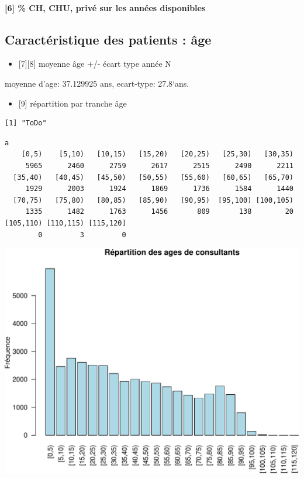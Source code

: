 \documentclass[]{article}
\begin{document}
\paragraph{{[}6{]} \% CH, CHU, privé sur les années
disponibles}\label{ch-chu-prive-sur-les-annees-disponibles}

\subsection{Caractéristique des patients :
âge}\label{caracteristique-des-patients-age}

\begin{itemize}
\itemsep1pt\parskip0pt
\item
  {[}7{]}{[}8{]} moyenne âge +/- écart type année N
\end{itemize}

moyenne d'age: 37.129925 ans, ecart-type: 27.8`ans.

\begin{itemize}
\itemsep1pt\parskip0pt
\item
  {[}9{]} répartition par tranche âge
\end{itemize}

\begin{verbatim}
[1] "ToDo"
\end{verbatim}

\begin{verbatim}
a
    [0,5)    [5,10)   [10,15)   [15,20)   [20,25)   [25,30)   [30,35) 
     5965      2460      2759      2617      2515      2490      2211 
  [35,40)   [40,45)   [45,50)   [50,55)   [55,60)   [60,65)   [65,70) 
     1929      2003      1924      1869      1736      1584      1440 
  [70,75)   [75,80)   [80,85)   [85,90)   [90,95)  [95,100) [100,105) 
     1335      1482      1763      1456       809       138        20 
[105,110) [110,115) [115,120] 
        0         3         0 
\end{verbatim}

\includegraphics{rapport_2014_files/figure-latex/tranche-1.pdf}
\end{document}
